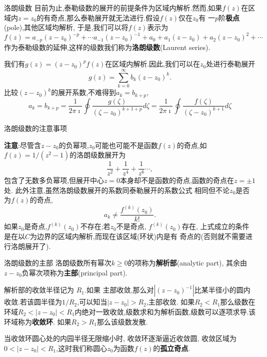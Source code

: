 \documentclass[fontset=windows, chinese, 10pt]{beamer}
\begin{document}
\begin{frame}{洛朗级数}
目前为止,泰勒级数的展开的前提条件为区域内解析.然而,如果$f(z)$在区域内$z=z_0$的有奇点,那么泰勒展开就无法进行.假设$f(z)$仅在$z_0$有
一$p$阶\textbf{极点}(pole),其他区域均解析,
于是,我们可以将$f(z)$表示为
\begin{equation}
    f(z) = a_{-p} (z-z_0)^{-p} + \cdots a_{-1}(z-z_0)^{-1} + a_0 + a_{1} (z-z_0) + a_{2} (z-z_0)^2 + \cdots 
\end{equation}
作为泰勒级数的延伸,这样的级数我们称为\textbf{洛朗级数}(Laurent series).

我们有$g(z) = (z-z_0)^p f(z)$在区域内解析.因此,我们可以在$z_0$处进行泰勒展开
\begin{equation}
    g(z) = \sum_{k=0}^{\infty} b_k (z-z_0)^{k} .
\end{equation}
比较$(z-z_0)^k$的展开系数,不难得到$a_k = b_{k+p}$,
\begin{equation}
    a_k = b_{k+p} = \frac{1}{2\pi \imath} \oint \frac{g(\zeta)}{(\zeta - z_0)^{k+1+p}} d\zeta 
    = \frac{1}{2\pi \imath} \oint \frac{f(\zeta)}{(\zeta - z_0)^{k+1}} d\zeta
\end{equation}

\end{frame}

\begin{frame}{洛朗级数的注意事项}

\textbf{注意}:尽管含$z-z_0$的负幂项,$z_0$可能也可能不是函数$f(z)$的奇点,如$f(z) = 1/(z^2-1)$的洛朗级数展开为
$$
\frac{1}{z^2} + \frac{1}{z^4} + \frac{1}{z^6}\cdots,
$$
包含了无数多负幂项,但展开中心$z=0$本身却不是函数的奇点,函数的奇点在$z=\pm 1$处. 此外注意,虽然洛朗级数展开的系数同泰勒展开的系数公式
相同但不论$z_0$是否为$f(z)$的奇点,
$$a_k \neq \frac{f^{(k)}(z_0)}{k!}.
$$
如果$z_0$是奇点,$f^{(k)}(z_0)$不存在;若$z_0$不是奇点, $f^{(k)}(z_0)$存在, 上式成立的条件是在以$C$为边界的区域内解析,而现在该区域(环状)内是有
奇点的(否则就不需要进行洛朗展开了).

\end{frame}

\begin{frame}{洛朗级数的主部}
  \small
洛朗级数所有幂次$k\geq 0$的项称为\textbf{解析部}(analytic part), 
其余由$z-z_0$负幂次项称为\textbf{主部}(principal part).

解析部的收敛半径记为
$R_1$.如果
主部收敛,那么对$|(z-z_0)^{-1}|$比某半径小的圆内收敛.若该圆半径为$1/R_2$,可以知当$|z-z_0|> R_2$,主部收敛.
如果$R_2 < R_1$那么级数在环域$R_2 < |z- z_0| < R_1$内绝对一致收敛,级数求和为解析函数,级数可以逐项求导.该环域称为\textbf{收敛环}.
如果$R_2 > R_1$那么该级数发散.

当收敛环圆心处的内园半径无限缩小时, 收敛环逐渐逼近收敛圆, 收敛区域为
$0 < |z-z_0| < R_1$,这时我们称圆心$z_0$为函数$f(z)$的\textbf{孤立奇点}.
\end{frame}
\end{document}
